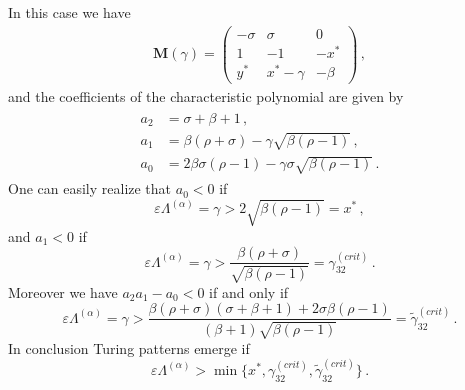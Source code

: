 \documentclass[aps,showpacs,preprintnumbers,amsmath,amssymb,twocolumn,superscriptaddress,floatfix,nofootinbib,10pt,pre]{revtex4-1}
\begin{document}
In this case we have 
\begin{align}
    \mathbf{M}(\gamma) =
    \begin{pmatrix}
        -\sigma & \sigma & 0 \\
        1 & -1 & -x^* \\
        y^* & x^*-\gamma & -\beta
    \end{pmatrix}\, ,
\end{align}
and the coefficients of the characteristic polynomial are given by
\begin{align}
\begin{aligned}
a_2 &= \sigma+\beta+1\, ,\\
a_1 &= \beta(\rho+\sigma)-\gamma\sqrt{\beta(\rho-1)}\, ,\\
a_0 &= 2\beta\sigma(\rho-1)-\gamma\sigma\sqrt{\beta(\rho-1)}\, .
\end{aligned}
\end{align}
One can easily realize that $a_0<0$ if
\begin{equation}
    \label{eq:condTP320}
    \varepsilon \Lambda^{(\alpha)}=\gamma >2\sqrt{\beta(\rho-1)}=x^*\, ,
\end{equation}
and $a_1<0$ if
\begin{equation}
    \label{eq:condTP321}
    \varepsilon \Lambda^{(\alpha)}=\gamma >\frac{\beta(\rho+\sigma)}{\sqrt{\beta(\rho-1)}}=\gamma^{(crit)}_{32}\, .
\end{equation}
Moreover we have $a_2a_1-a_0<0$ if and only if
\begin{equation*}
\varepsilon \Lambda^{(\alpha)}=\gamma >\frac{
\beta(\rho+\sigma)(\sigma+\beta+1)+2\sigma \beta(\rho-1)}{(\beta+1)\sqrt{\beta(\rho-1)}}
=\tilde{\gamma}^{(crit)}_{32}\, .
\end{equation*}
In conclusion Turing patterns emerge if 
\begin{equation}
    \label{eq:condTP32}
    \varepsilon\Lambda^{(\alpha)} >\min\Big\{x^*,\gamma^{(crit)}_{32},\tilde{\gamma}^{(crit)}_{32}\Big\}\, .
\end{equation}
\end{document}
